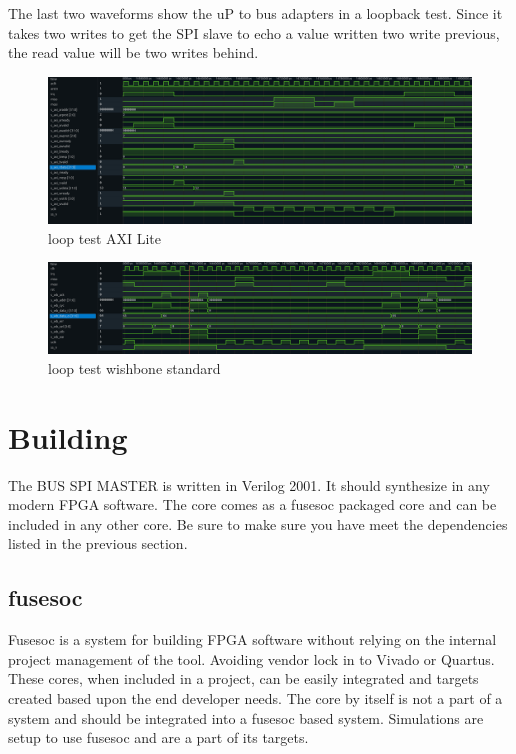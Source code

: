 \par
The last two waveforms show the uP to bus adapters in a loopback test. Since it takes two writes to get the SPI slave to
echo a value written two write previous, the read value will be two writes behind.
\begin{figure}[H]
\caption{loop test AXI Lite}
\centering
\includegraphics[width=\textwidth]{img/diagrams/waveform_loop_test_axil.png}
\end{figure}

\begin{figure}[H]
\caption{loop test wishbone standard}
\centering
\includegraphics[width=\textwidth]{img/diagrams/waveform_loop_test_wishbone_standard.png}
\end{figure}

\section{Building}

\par
The BUS SPI MASTER is written in Verilog 2001. It should synthesize in any modern FPGA software. The core comes as a fusesoc packaged core and can be
included in any other core. Be sure to make sure you have meet the dependencies listed in the previous section.

\subsection{fusesoc}
\par
Fusesoc is a system for building FPGA software without relying on the internal project management of the tool. Avoiding vendor lock in to Vivado or Quartus.
These cores, when included in a project, can be easily integrated and targets created based upon the end developer needs. The core by itself is not a part of
a system and should be integrated into a fusesoc based system. Simulations are setup to use fusesoc and are a part of its targets.

